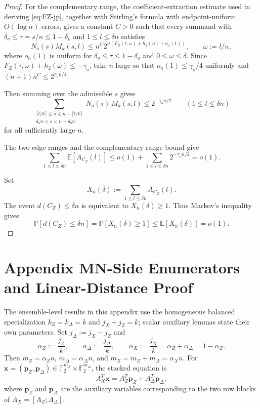 \documentclass[11pt]{article}
\theoremstyle{definition}
\newcommand{\engappendixsection}[2]{%
  \refstepcounter{section}%
  \section*{Appendix \thesection\quad #1}%
  \label{#2}%
}
\newcommand{\F}{\mathbb F}
\newcommand{\EE}{\mathbb E}
\newcommand{\PP}{\mathbb P}
\newcommand{\bp}{\mathbf p}
\newcommand{\bx}{\mathbf x}
\newcommand{\h}{h_2}
\newcommand{\CZ}{C_Z}
\begin{document}
\begin{proof}
For the complementary range, the coefficient-extraction estimate used in deriving \eqref{eq:FZ-jp}, together with Stirling's formula with endpoint-uniform \(O(\log n)\) errors, gives a constant \(C>0\) such that every summand with \(\delta_o\le\tau=s/n\le1-\delta_o\) and \(1\le l\le\delta n\) satisfies
\[
N_o(s)M_k(s,l)
\le
n^C2^{n(F_Z(\tau,\omega)+\h(\omega)+o_n(1))},
\qquad
\omega:=l/n,
\]
where \(o_n(1)\) is uniform for \(\delta_o\le\tau\le1-\delta_o\) and \(0\le\omega\le\delta\). Since \(F_Z(\tau,\omega)+\h(\omega)\le-\gamma_o\), take \(n\) large so that \(o_n(1)\le\gamma_o/4\) uniformly and \((n+1)n^C\le2^{\gamma_o n/4}\).

Then summing over the admissible \(s\) gives
\begin{equation*}
\sum_{\substack{\lceil l/k\rceil\le s\le n-\lceil l/k\rceil\\ \delta_o n< s< n-\delta_o n}}
N_o(s)\,M_k(s,l)
\le
2^{-\gamma_o n/2}
\qquad
(1\le l\le \delta n)
\end{equation*}
for all sufficiently large \(n\).

The two edge ranges and the complementary range bound give
\begin{equation*}
\sum_{1\le l\le \delta n}\EE[A_{\CZ}(l)]
\le
o(1)+
\sum_{1\le l\le \delta n}2^{-\gamma_o n/2}
=o(1).
\end{equation*}

Set
\begin{equation*}
X_n(\delta):=\sum_{1\le l\le \delta n}A_{\CZ}(l).
\end{equation*}
The event \(d(\CZ)\le \delta n\) is equivalent to \(X_n(\delta)\ge 1\).
Thus Markov's inequality gives
\begin{equation*}
\PP[d(\CZ)\le \delta n]
=
\PP[X_n(\delta)\ge 1]
\le
\EE[X_n(\delta)]
=o(1).
\end{equation*}
\end{proof}


\engappendixsection{MN-Side Enumerators and Linear-Distance Proof}{app:MN-proofs-jp}

The ensemble-level results in this appendix use the homogeneous balanced specialization \(k_Z=k_\Delta=k\) and \(j_X+j_Z=k\); scalar auxiliary lemmas state their own parameters.
Set \(j_\Delta:=j_X-j_Z\) and
\[
\alpha_Z:=\frac{j_Z}{k},\qquad
\alpha_\Delta:=\frac{j_\Delta}{k},\qquad
\alpha_X:=\frac{j_X}{k}=\alpha_Z+\alpha_\Delta=1-\alpha_Z.
\]
Then \(m_Z=\alpha_Z n\), \(m_\Delta=\alpha_\Delta n\), and \(m_X=m_Z+m_\Delta=\alpha_X n\).
For \(\bx=(\bp_Z,\bp_\Delta)\in \F_2^{m_Z}\times \F_2^{m_\Delta}\), the stacked equation is
\[
A_X^T \bx=A_Z^T \bp_Z + A_\Delta^T \bp_\Delta,
\]
where \(\bp_Z\) and \(\bp_\Delta\) are the auxiliary variables corresponding to the two row blocks of \(A_X=[A_Z;A_\Delta]\).
\end{document}
